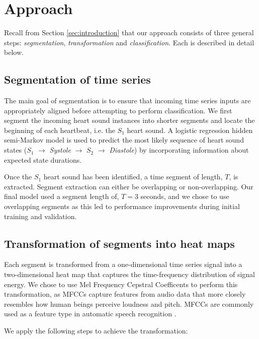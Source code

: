 \documentclass{article}
\begin{document}
\section{Approach}
\label{sec:approach}

Recall from Section \ref{sec:introduction} that our approach consists of three general steps: \emph{segmentation}, \emph{transformation} and \emph{classification}. Each is described in detail below.

\subsection{Segmentation of time series}

The main goal of segmentation is to ensure that incoming time series inputs are appropriately aligned before attempting to perform classification. We first segment the incoming heart sound instances into shorter segments and locate the beginning of each heartbeat, i.e. the $S_1$ heart sound. A logistic regression hidden semi-Markov model \cite{springer2016logistic} is used to predict the most likely sequence of heart sound states ($S_1$  $\rightarrow$ \emph{Systole} $ \rightarrow$ $S_2$ $ \rightarrow$ \emph{Diastole}) by incorporating information about expected state durations. 

Once the $S_1$ heart sound has been identified, a time segment of length, $T$, is extracted. Segment extraction can either be overlapping or non-overlapping. Our final model used a segment length of, $T = 3$ seconds, and we chose to use overlapping segments as this led to performance improvements during initial training and validation.

\subsection{Transformation of segments into heat maps}

Each segment is transformed from a one-dimensional time series signal into a two-dimensional heat map that captures the time-frequency distribution of signal energy. We chose to use Mel Frequency Cepstral Coefficents \cite{davis1980comparison} to perform this transformation, as MFCCs capture features from audio data that more closely resembles how human beings perceive loudness and pitch. MFCCs are commonly used as a feature type in automatic speech recognition \cite{godino2004automatic}. 

We apply the following steps to achieve the transformation:
\end{document}
